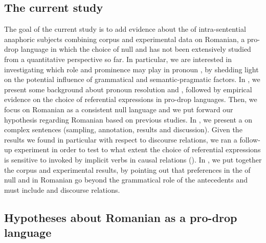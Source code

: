 \documentclass[output=paper,colorlinks,citecolor=brown]{langscibook}
\begin{document}
\subsection{The current study}
The goal of the current study is to add evidence about the  of intra-sentential anaphoric subjects combining corpus and experimental data on Romanian, a pro-drop language in which the choice of null and  has not been extensively studied from a quantitative perspective so far. In particular, we are interested in investigating which role  and prominence may play in pronoun , by shedding light on the potential influence of grammatical and semantic-pragmatic factors. In , we present some background about pronoun resolution and , followed by empirical evidence on the choice of referential expressions in pro-drop languages. Then, we focus on Romanian as a consistent null  language and we put forward our hypothesis regarding Romanian based on previous studies. In , we present a  on complex sentences (sampling, annotation, results and discussion). Given the results we found in particular with respect to discourse relations, we ran a follow-up experiment in order to test to what extent the choice of referential expressions is sensitive to  invoked by implicit  verbs in causal relations (). In , we put together the corpus and experimental results, by pointing out that preferences in the  of null and  in Romanian go beyond the grammatical role of the antecedents and must include  and discourse relations.  

\subsection{Hypotheses about Romanian as a pro-drop language}
\end{document}
